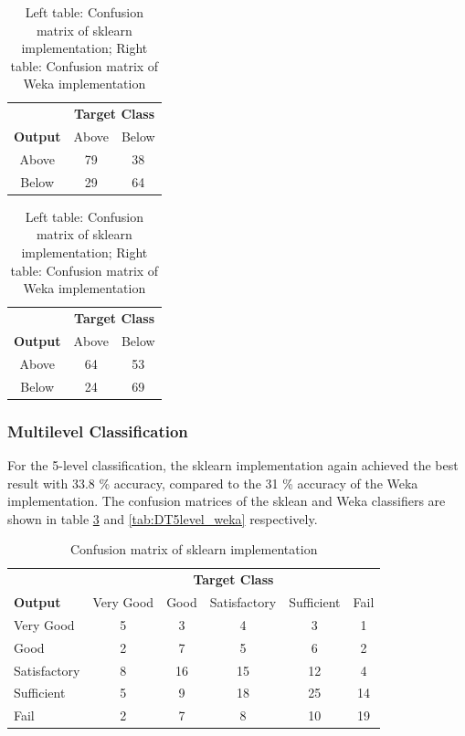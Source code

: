 \begin{table}[h]
\begin{center}
  \begin{tabular}{c|cc}
  & \multicolumn{2}{c}{\textbf{Target Class}} \\
 \textbf{Output} & Above & Below\\ \hline
  Above & 79 & 38 \\
  Below & 29 & 64
\end{tabular}
\quad
\begin{tabular}{c|cc}
  & \multicolumn{2}{c}{\textbf{Target Class}} \\
 \textbf{Output} & Above & Below\\ \hline
  Above & 64 & 53 \\
  Below & 24 & 69
\end{tabular}
\caption{Left table: Confusion matrix of sklearn implementation; Right table: Confusion matrix of Weka implementation }
\label{tab:DTbinary}
\end{center}
\end{table}

\subsubsection{Multilevel Classification}
For the 5-level classification, the sklearn implementation again achieved the best result with 33.8 \% accuracy, compared to the 31 \% accuracy of the Weka implementation. The confusion matrices of the sklean and Weka classifiers are shown in table \ref{tab:DT5level_sklearn} and \ref{tab:DT5level_weka} respectively.

\begin{table}[h]
  \begin{tabular}{l|ccccc}
     & \multicolumn{5}{c}{\textbf{Target Class}} \\ 
  \textbf{Output} & Very Good & Good & Satisfactory & Sufficient & Fail \\  \hline
  Very Good  & 5 & 3 & 4 & 3 & 1\\
     Good & 2 & 7 & 5 & 6 & 2\\
     Satisfactory & 8 & 16 & 15 & 12 & 4\\
     Sufficient & 5 & 9 & 18 & 25 & 14\\
     Fail & 2 & 7 & 8 & 10 & 19\\
  \end{tabular}
  \caption{Confusion matrix of sklearn implementation}
\label{tab:DT5level_sklearn}
\end{table}

